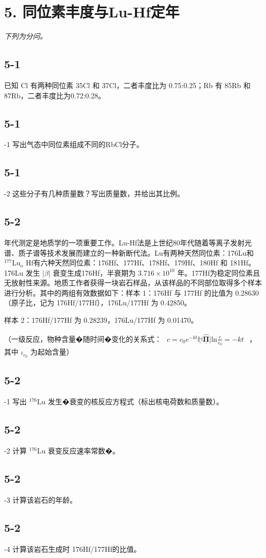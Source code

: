 \section*{5. 同位素丰度与Lu-Hf定年}
\textit{下列为分问。}

\subsection*{5-1}
已知 Cl 有两种同位素 35Cl 和 37Cl，⼆者丰度⽐为 0.75:0.25；Rb 有 85Rb 和 87Rb，⼆者丰度⽐为0.72:0.28。

\subsection*{5-1}
-1 写出⽓态中同位素组成不同的RbCl分⼦。

\subsection*{5-1}
-2 这些分⼦有⼏种质量数？写出质量数，并给出其⽐例。

\subsection*{5-2}
年代测定是地质学的⼀项重要⼯作。Lu-Hf法是上世纪80年代随着等离⼦发射光谱、质⼦谱等技术发展⽽建⽴的⼀种新断代法。Lu有两种天然同位素：176Lu和 $^ { 1 7 7 } \mathrm { L u } _ { \mathrm { o } }$ Hf有六种天然同位素：176Hf、177Hf、178Hf、179Hf、180Hf 和 181Hf。176Lu 发⽣ $\lvert \beta \rvert$ 衰变⽣成176Hf，半衰期为 $3 . 7 1 6 \times 1 0 ^ { 1 0 }$ 年。177Hf为稳定同位素且⽆放射性来源。地质⼯作者获得⼀块岩⽯样品，从该样品的不同部位取得多个样本进⾏分析。其中的两组有效数据如下：样本 1：176Hf 与 177Hf 的⽐值为 0.28630（原⼦⽐，记为 176Hf/177Hf），176Lu/177Hf 为 0.42850。

样本 2：176Hf/177Hf 为 0.28239，176Lu/177Hf 为 0.01470。

（⼀级反应，物种含量�随时间�变化的关系式： $\begin{array} { r } { c = c _ { 0 } e ^ { - k t } \underline { { \mathbb { H } } } \underline { { \hat { \mathbf { \Pi } } } } | \mathrm { l n } \frac { c } { c _ { 0 } } = - k t } \end{array}$ ，其中 $\iota _ { c _ { 0 } }$ 为起始含量）

\subsection*{5-2}
-1 写出 $^ \mathrm { 1 7 6 } \mathrm { L u }$ 发⽣�衰变的核反应⽅程式（标出核电荷数和质量数）。

\subsection*{5-2}
-2 计算 $^ { 1 7 6 } \mathrm { L u }$ 衰变反应速率常数�。

\subsection*{5-2}
-3 计算该岩⽯的年龄。

\subsection*{5-2}
-4 计算该岩⽯⽣成时 176Hf/177Hf的⽐值。
